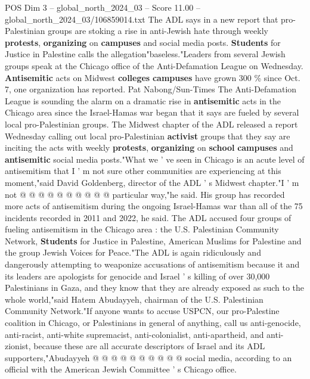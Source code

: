 \begin{textsample}{POS Dim 3 – global\_north\_2024\_03 – Score 11.00 – global\_north\_2024\_03/106859014.txt}  \label{ex:f3_pos_293}
The ADL says in a new report that pro-Palestinian groups are stoking a rise in anti-Jewish hate through weekly \textbf{protests}, \textbf{organizing} on \textbf{campuses} and social media posts. \textbf{Students} for Justice in Palestine calls the allegation"baseless."Leaders from several Jewish groups speak at the Chicago office of the Anti-Defamation League on Wednesday. \textbf{Antisemitic} acts on Midwest \textbf{colleges} \textbf{campuses} have grown 300 \% since Oct. 7, one organization has reported.
Pat Nabong/Sun-Times The Anti-Defamation League is sounding the alarm on a dramatic rise in \textbf{antisemitic} acts in the Chicago area since the Israel-Hamas war began that it says are fueled by several local pro-Palestinian groups.
The Midwest chapter of the ADL released a report Wednesday calling out local pro-Palestinian \textbf{activist} groups that they say are inciting the acts with weekly \textbf{protests}, \textbf{organizing} on \textbf{school} \textbf{campuses} and \textbf{antisemitic} social media posts."What we ' ve seen in Chicago is an acute level of antisemitism that I ' m not sure other communities are experiencing at this moment,"said David Goldenberg, director of the ADL ' s Midwest chapter."I ' m not @ @ @ @ @ @ @ @ @ @ particular way,"he said.
His group has recorded more acts of antisemitism during the ongoing Israel-Hamas war than all of the 75 incidents recorded in 2011 and 2022, he said.
The ADL accused four groups of fueling antisemitism in the Chicago area : the U.S.
Palestinian Community Network, \textbf{Students} for Justice in Palestine, American Muslims for Palestine and the group Jewish Voices for Peace."The ADL is again ridiculously and dangerously attempting to weaponize accusations of antisemitism because it and its leaders are apologists for genocide and Israel ' s killing of over 30,000 Palestinians in Gaza, and they know that they are already exposed as such to the whole world,"said Hatem Abudayyeh, chairman of the U.S.
Palestinian Community Network."If anyone wants to accuse USPCN, our pro-Palestine coalition in Chicago, or Palestinians in general of anything, call us anti-genocide, anti-racist, anti-white supremacist, anti-colonialist, anti-apartheid, and anti-zionist, because these are all accurate descriptors of Israel and its ADL supporters,"Abudayyeh @ @ @ @ @ @ @ @ @ @ social media, according to an official with the American Jewish Committee ' s Chicago office.

\end{textsample}
